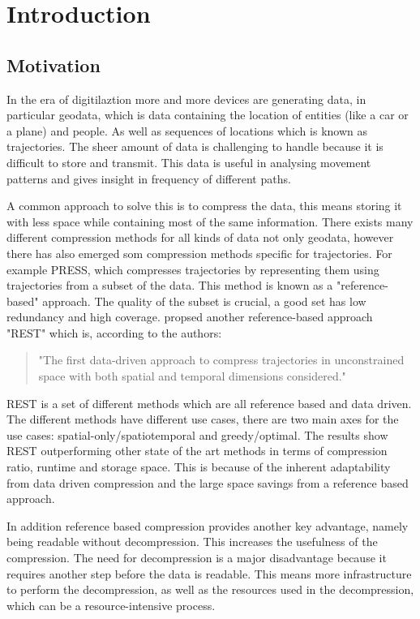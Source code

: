 \chapter{Introduction}
\section{Motivation}

In the era of digitilaztion more and more devices are generating data, in particular geodata, which is data containing the location of entities (like a car or a plane) and people. As well as sequences of locations which is known as trajectories. The sheer amount of data is challenging to handle because it is difficult to store and transmit. This data is useful in analysing movement patterns and gives insight in frequency of different paths.

A common approach to solve this is to compress the data, this means storing it with less space while containing most of the same information. There exists many different compression methods for all kinds of data not only geodata, however there has also emerged som compression methods specific for trajectories. For example PRESS, which compresses trajectories by representing them using trajectories from a subset of the data. This method is known as a "reference-based" approach. The quality of the subset is crucial, a good set has low redundancy and high coverage. \cite{zhao2018rest} propsed another reference-based approach "REST" which is, according to the authors:
\begin{quote}
    "The first data-driven approach to compress trajectories in unconstrained space with both spatial and temporal dimensions considered."
\end{quote}
REST is a set of different methods which are all reference based and data driven. The different methods have different use cases, there are two main axes for the use cases: spatial-only/spatiotemporal and greedy/optimal. The results show REST outperforming other state of the art methods in terms of compression ratio, runtime and storage space. This is because of the inherent adaptability from data driven compression and the large space savings from a reference based approach.

In addition reference based compression provides another key advantage, namely being readable without decompression. This increases the usefulness of the compression. The need for decompression is a major disadvantage because it requires another step before the data is readable. This means more infrastructure to perform the decompression, as well as the resources used in the decompression, which can be a resource-intensive process.

